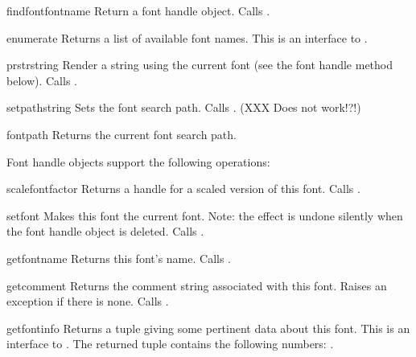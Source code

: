\begin{funcdesc}{findfont}{fontname}
Return a font handle object.
Calls .
\end{funcdesc}

\begin{funcdesc}{enumerate}{}
Returns a list of available font names.
This is an interface to .
\end{funcdesc}

\begin{funcdesc}{prstr}{string}
Render a string using the current font (see the  font
handle method below).
Calls .
\end{funcdesc}

\begin{funcdesc}{setpath}{string}
Sets the font search path.
Calls .
(XXX Does not work!?!)
\end{funcdesc}

\begin{funcdesc}{fontpath}{}
Returns the current font search path.
\end{funcdesc}

Font handle objects support the following operations:

\renewcommand{\indexsubitem}{(font handle method)}
\begin{funcdesc}{scalefont}{factor}
Returns a handle for a scaled version of this font.
Calls .
\end{funcdesc}

\begin{funcdesc}{setfont}{}
Makes this font the current font.
Note: the effect is undone silently when the font handle object is
deleted.
Calls .
\end{funcdesc}

\begin{funcdesc}{getfontname}{}
Returns this font's name.
Calls .
\end{funcdesc}

\begin{funcdesc}{getcomment}{}
Returns the comment string associated with this font.
Raises an exception if there is none.
Calls .
\end{funcdesc}

\begin{funcdesc}{getfontinfo}{}
Returns a tuple giving some pertinent data about this font.
This is an interface to .
The returned tuple contains the following numbers:
.
\end{funcdesc}

